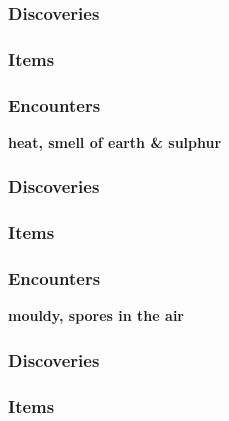 \subsubsection{Discoveries}
\begin{itemize}
\end{itemize}
\subsubsection{Items}
\begin{itemize}
\end{itemize}
\subsubsection{Encounters}
\begin{itemize}
\end{itemize}

\textbf{heat, smell of earth \& sulphur}
\begin{DndReadAloud}
\end{DndReadAloud}
\subsubsection{Discoveries}
\begin{itemize}
\end{itemize}
\subsubsection{Items}
\begin{itemize}
\end{itemize}
\subsubsection{Encounters}
\begin{itemize}
\end{itemize}

\textbf{mouldy, spores in the air}
\begin{DndReadAloud}
\end{DndReadAloud}
\subsubsection{Discoveries}
\begin{itemize}
\end{itemize}
\subsubsection{Items}
\begin{itemize}
\end{itemize}
